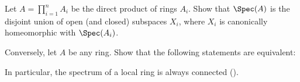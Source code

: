 \begin{exercise}
Let \(A = \prod_{i=1}^n A_i\) be the direct product of rings \(A_i\).
Show that \(\Spec(A)\) is the disjoint union of open (and closed) subspaces \(X_i\), where \(X_i\) is canonically homeomorphic with \(\Spec(A_i)\).

Conversely, let \(A\) be any ring.
Show that the following statements are equivalent:

In particular, the spectrum of a local ring is always connected ().
\end{exercise}

\begin{solution}

\end{solution}